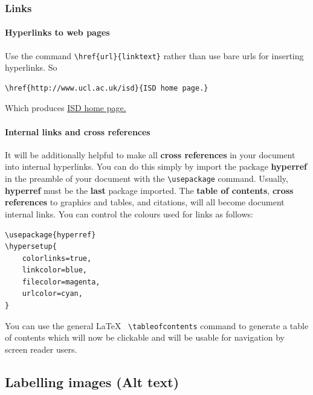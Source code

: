 \documentclass[]{article}
\begin{document}
\hypertarget{links}{%
\subsubsection{Links}\label{links}}

\hypertarget{hyperlinks-to-web-pages}{%
\paragraph{Hyperlinks to web pages}\label{hyperlinks-to-web-pages}}

Use the command \texttt{\textbackslash{}href\{url\}\{linktext\}} rather
than use bare urls for inserting hyperlinks. So

\begin{verbatim}
\href{http://www.ucl.ac.uk/isd}{ISD home page.}
\end{verbatim}

Which produces \href{http://www.ucl.ac.uk/isd}{ISD home page.}

\hypertarget{internal-links-and-cross-references}{%
\paragraph{Internal links and cross
references}\label{internal-links-and-cross-references}}

It will be additionally helpful to make all \textbf{cross references} in
your document into internal hyperlinks. You can do this simply by import
the package \textbf{hyperref} in the preamble of your document with the
\texttt{\textbackslash{}usepackage} command. Usually, \textbf{hyperref}
must be the \textbf{last} package imported. The \textbf{table of
contents}, \textbf{cross references} to graphics and tables, and
citations, will all become document internal links. You can control the
colours used for links as follows:

\begin{verbatim}
\usepackage{hyperref}
\hypersetup{
    colorlinks=true,
    linkcolor=blue,
    filecolor=magenta,
    urlcolor=cyan,
}
\end{verbatim}

You can use the general \LaTeX~ \texttt{\textbackslash{}tableofcontents}
command to generate a table of contents which will now be clickable and
will be usable for navigation by screen reader users.

\hypertarget{labelling-images-alt-text}{%
\subsection{Labelling images (Alt
text)}\label{labelling-images-alt-text}}
\end{document}
